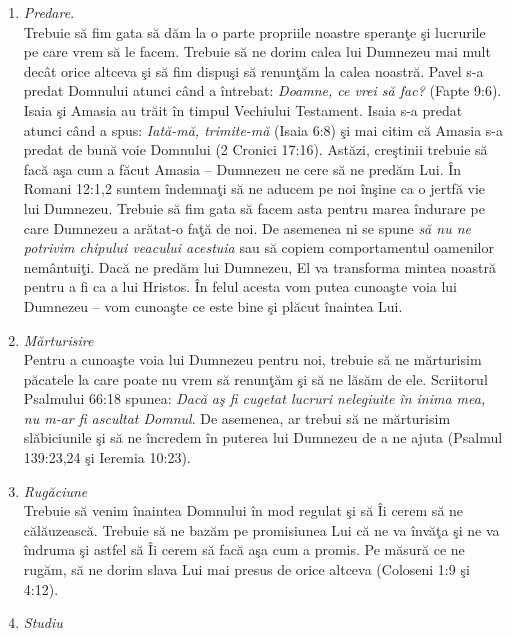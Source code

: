 \begin{enumerate}

	\item \textsl{Predare}. \\ 
	
	Trebuie să fim gata să dăm la o parte propriile noastre speranţe şi lucrurile pe care vrem să le facem. Trebuie să ne dorim calea lui Dumnezeu mai mult decât orice altceva şi să fim dispuşi să renunţăm la calea noastră. Pavel s-a predat Domnului atunci când a întrebat: \textit{Doamne, ce vrei să fac?} (Fapte 9:6). Isaia şi Amasia au trăit în timpul Vechiului Testament. Isaia s-a predat atunci când a spus: \textit{Iată-mă, trimite-mă} (Isaia 6:8) şi mai citim că Amasia s-a predat de bună voie Domnului (2 Cronici 17:16). Astăzi, creştinii trebuie să facă aşa cum a făcut Amasia – Dumnezeu ne cere să ne predăm Lui. În Romani 12:1,2 suntem îndemnaţi să ne aducem pe noi înşine ca o jertfă vie lui Dumnezeu. Trebuie să fim gata să facem asta pentru marea îndurare pe care Dumnezeu a arătat-o faţă de noi. De asemenea ni se spune \textit{să nu ne potrivim chipului veacului acestuia} sau să copiem comportamentul oamenilor nemântuiţi. Dacă ne predăm lui Dumnezeu, El va transforma mintea noastră pentru a fi ca a lui Hristos. În felul acesta vom putea cunoaşte voia lui Dumnezeu – vom cunoaşte ce este bine şi plăcut înaintea Lui.
	
	\item \textit{Mărturisire} \\
	
	Pentru a cunoaşte voia lui Dumnezeu pentru noi, trebuie să ne mărturisim păcatele la care poate nu vrem să renunţăm şi să ne lăsăm de ele. Scriitorul Psalmului 66:18 spunea: \textit{Dacă aş fi cugetat lucruri nelegiuite în inima mea, nu m-ar fi ascultat Domnul}. De asemenea, ar trebui să ne mărturisim slăbiciunile şi să ne încredem în puterea lui Dumnezeu de a ne ajuta (Psalmul 139:23,24 şi Ieremia 10:23).  
	
	\item \textit{Rugăciune} \\
	
	Trebuie să venim înaintea Domnului în mod regulat şi să Îi cerem să ne călăuzească. Trebuie să ne bazăm pe promisiunea Lui că ne va învăţa şi ne va îndruma şi astfel să Îi cerem să facă aşa cum a promis. Pe măsură ce ne rugăm, să ne dorim slava Lui mai presus de orice altceva (Coloseni 1:9 şi 4:12).
	
	\item \textit{Studiu} \\
	

\end{enumerate}
